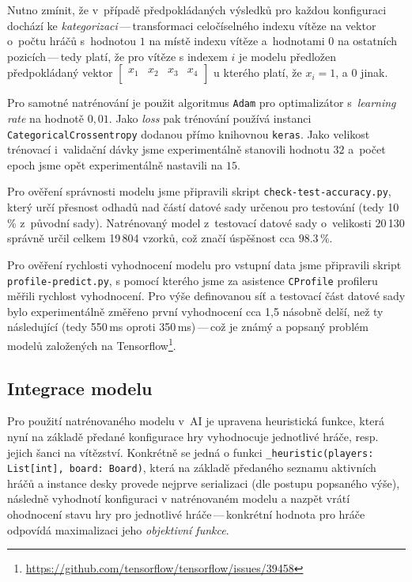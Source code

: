 \documentclass[11pt, a4paper]{article}
\theoremstyle{definition}
\begin{document}
Nutno zmínit, že v~případě předpokládaných výsledků pro každou konfiguraci dochází ke \emph{kategorizaci}\,---\,transformaci celočíselného indexu vítěze na vektor o~počtu hráčů s~hodnotou $1$ na místě indexu vítěze a~hodnotami $0$ na ostatních pozicích\,---\,tedy platí, že pro vítěze s indexem $i$ je modelu předložen předpokládaný vektor $\begin{bmatrix}
  x_1 & x_2 & x_3 & x_4 \\ 
\end{bmatrix}$ u kterého platí, že $x_i = 1$, a $0$ jinak.

Pro samotné natrénování je použit algoritmus \texttt{Adam} pro optimalizátor s~\emph{learning rate} na hodnotě $0,01$. Jako \emph{loss} pak trénování používá instanci \texttt{CategoricalCrossentropy} dodanou přímo knihovnou \texttt{keras}.
Jako velikost trénovací i~validační dávky jsme experimentálně stanovili hodnotu $32$ a~počet epoch jsme opět experimentálně nastavili na $15$.

Pro ověření správnosti modelu jsme připravili skript \texttt{check-test-accuracy.py}, který určí přesnost odhadů nad částí datové sady určenou pro testování (tedy 10\,\% z~původní sady). Natrénovaný model z~testovací datové sady o~velikosti
20\,130 správně určil celkem 19\,804 vzorků, což značí úspěšnost cca $98.3\,\%$.

Pro ověření rychlosti vyhodnocení modelu pro vstupní data jsme připravili skript \texttt{profile-predict.py}, s pomocí kterého jsme za asistence \texttt{CProfile} profileru měřili rychlost vyhodnocení. Pro výše definovanou síť a testovací část datové sady bylo experimentálně změřeno první vyhodnocení cca 1,5 násobně delší, než ty následující (tedy 550\,ms oproti 350\,ms)\,---\,což je známý a popsaný problém modelů založených na Tensorflow\footnote{\url{https://github.com/tensorflow/tensorflow/issues/39458}}.

\subsection{Integrace modelu}
\label{subsec:model-integration}
Pro použití natrénovaného modelu v~AI je upravena heuristická funkce, která nyní na základě předané konfigurace hry vyhodnocuje jednotlivé hráče, resp. jejich šanci na vítězství. Konkrétně se jedná o funkci \texttt{\_heuristic(players: List[int], board: Board)}, která na základě předaného seznamu aktivních hráčů a instance desky provede nejprve serializaci (dle postupu popsaného výše), následně vyhodnotí konfiguraci v natrénovaném modelu a nazpět vrátí ohodnocení stavu hry pro jednotlivé hráče\,---\,konkrétní hodnota pro hráče odpovídá maximalizaci jeho \emph{objektivní funkce}.
\end{document}
